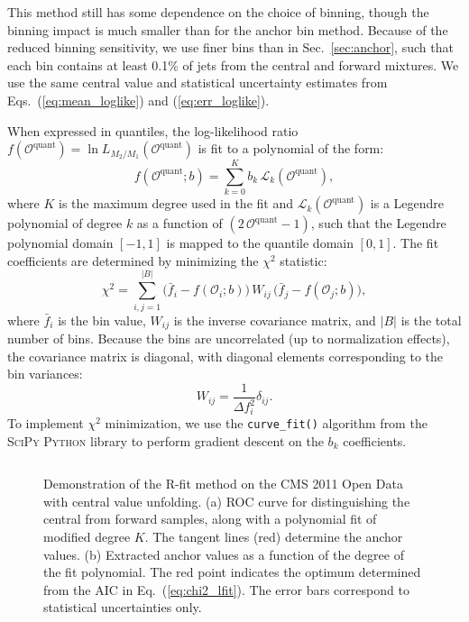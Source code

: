 \documentclass[aps,prd,twocolumn,preprintnumbers,nofootinbib,longbibliography,floatfix]{revtex4-1}
\DeclareRobustCommand{\Sec}[1]{Sec.~\ref{#1}}
\DeclareRobustCommand{\Eq}[1]{Eq.~(\ref{#1})}
\DeclareRobustCommand{\Eqs}[2]{Eqs.~(\ref{#1}) and (\ref{#2})}
\newcommand{\figO}{\mathcal{O}}
\newcommand{\figL}{\mathcal{L}}
\begin{document}
This method still has some dependence on the choice of binning, though the binning impact is much smaller than for the anchor bin method.
%
Because of the reduced binning sensitivity, we use finer bins than in \Sec{sec:anchor}, such that each bin contains at least 0.1\% of jets from the central and forward mixtures.
%
We use the same central value and statistical uncertainty estimates from \Eqs{eq:mean_loglike}{eq:err_loglike}.


When expressed in quantiles, the log-likelihood ratio $f(\mathcal{O}^\mathrm{quant}) = \ln{L_{M_2/M_1}(\mathcal{O}^\mathrm{quant})}$ is fit to a polynomial of the form:
%
\begin{equation}
f(\mathcal{O}^\mathrm{quant}; b) = \sum_{k = 0}^K b_k \, \figL_k(\mathcal{O}^\mathrm{quant}),
\end{equation} 
%
where $K$ is the maximum degree used in the fit and $\figL_k(\mathcal{O}^\mathrm{quant})$ is a Legendre polynomial of degree $k$ as a function of $(2 \, \mathcal{O}^\mathrm{quant}-1)$, such that the Legendre polynomial domain $[-1, 1]$ is mapped to the quantile domain $[0, 1]$.
%
The fit coefficients are determined by minimizing the $\chi^2$ statistic:
%
\begin{equation}
	\label{eq:chi2_l-fit}
	\chi^2 = \sum_{i, j = 1}^{|B|} \big(\bar{f}_i - f(\figO_i; b)\big) \, W_{ij} \, \big(\bar{f}_j - f(\figO_j; b)\big),
\end{equation}
%
where $\bar{f}_i$ is the bin value, $W_{ij}$ is the inverse covariance matrix, and $|B|$ is the total number of bins.
%
Because the bins are uncorrelated (up to normalization effects), the covariance matrix is diagonal, with diagonal elements corresponding to the bin variances:
%
\begin{equation}
	W_{ij} = \frac{1}{\Delta f_i^2} \delta_{ij}.
\end{equation}
%
To implement $\chi^2$ minimization, we use the \texttt{curve\_fit()} algorithm from the \textsc{SciPy} \textsc{Python} library \cite{virtanen_scipy_2020} to perform gradient descent on the $b_k$ coefficients. 


\begin{figure*}[t]
	$\quad$
	\caption{Demonstration of the R-fit method on the CMS 2011 Open Data with central value unfolding.
	(a) ROC curve for distinguishing the central from forward samples, along with a polynomial fit of modified degree $K$.  The tangent lines (red) determine the anchor values.
	(b) Extracted anchor values as a function of the degree of the fit polynomial.  The red point indicates the optimum determined from the AIC in \Eq{eq:chi2_lfit}.
	The error bars correspond to statistical uncertainties only.
}
	\label{fig:r_fit_method_all}
\end{figure*}
\end{document}
